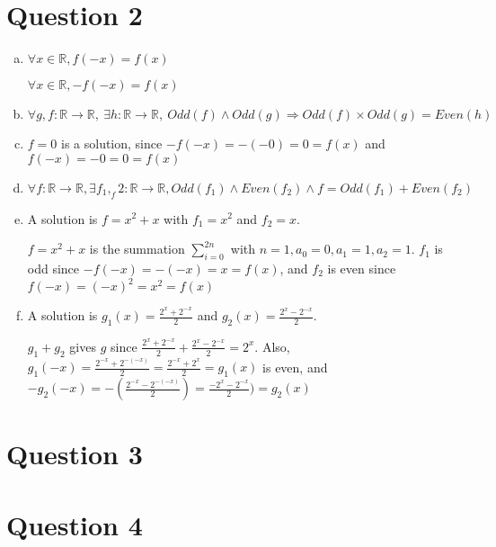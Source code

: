 \documentclass[12pt]{article}
\begin{document}
\section*{Question 2}
\begin{enumerate}[a.]
    \item
    $\forall x \in \mathbb{R}, f(-x) = f(x)$

    $\forall x \in \mathbb{R}, -f(-x) = f(x)$

    \item

    $\forall g,f:\mathbb{R} \to \mathbb{R},\:\exists h:\mathbb{R} \to \mathbb{R},\:Odd(f) \land Odd(g) \Rightarrow Odd(f) \times Odd(g) = Even(h)$

    \item

    $f = 0$ is a solution, since $-f(-x) = -(-0) = 0 = f(x)$ and $f(-x) = -0 = 0 = f(x)$

    \item

    $\forall f: \mathbb{R} \to \mathbb{R}, \exists f_1, _f2:\mathbb{R} \to \mathbb{R}, Odd(f_1) \land Even(f_2) \land f = Odd(f_1) + Even(f_2)$

    \item

    A solution is $f = x^2 + x$ with $f_1 = x^2$ and $f_2 = x$.

    $f = x^2 + x$ is the summation $\sum\limits_{i=0}^{2n}$ with $n = 1, a_0 = 0, a_1 = 1, a_2 = 1$.
    $f_1$ is odd since $-f(-x) = -(-x) = x = f(x)$, and $f_2$ is even since $f(-x) = (-x)^2 = x^2 = f(x)$

    \item

    A solution is $g_1(x) = \frac{2^x + 2^{-x}}{2}$ and $g_2(x) = \frac{2^{x} - 2^{-x}}{2}$.

    $g_1 + g_2$ gives $g$ since $\frac{2^x + 2^{-x}}{2} + \frac{2^{x} - 2^{-x}}{2} = 2^x$.
    Also, $g_1(-x) = \frac{2^{-x} + 2^{-(-x)}}{2} = \frac{2^{-x} + 2^{x}}{2} = g_1(x)$ is even, and
    $-g_2(-x) = -(\frac{2^{-x} - 2^{-(-x)}}{2}) = \frac{-2^{x} - 2^{-x}}{2}) = g_2(x)$


\end{enumerate}

\section*{Question 3}

\section*{Question 4}
\end{document}
